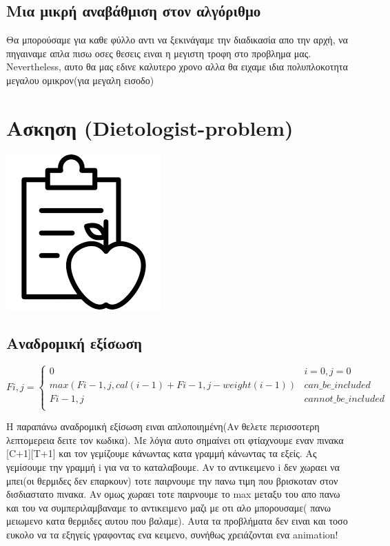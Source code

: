 \documentclass[12pt]{article}
\begin{document}
\subsection{Μια μικρή αναβάθμιση στον αλγόριθμο}
Θα μπορούσαμε για καθε φύλλο αντι να ξεκινάγαμε την διαδικασία απο την αρχή, να πηγαιναμε απλα πισω οσες θεσεις ειναι η μεγιστη τροφη στο προβλημα μας. Nevertheless, αυτο θα μας εδινε καλυτερο χρονο αλλα θα ειχαμε ιδια πολυπλοκοτητα μεγαλου ομικρον(για μεγαλη εισοδο)



\section{Ασκηση (Dietologist-problem)}
\begin{center}
	\includegraphics[scale=0.45]{diet.png}
\end{center}


\subsection{Αναδρομική εξίσωση}


\[ 
F{i,j}= \left\{
\begin{array}{ll}
0 & i=0,j=0 \\
max(F{i-1,j}, cal(i-1) + F{i-1, j - weight(i-1)})& can\_be\_included\\
F{i-1,j}& cannot\_be\_included \\
\end{array} 
\right. 
\]

Η παραπάνω αναδρομική εξίσωση ειναι απλοποιημένη(Αν θελετε περισσοτερη λεπτομερεια δειτε τον κωδικα). Με λόγια αυτο σημαίνει οτι φτίαχνουμε εναν πινακα [C+1][T+1] και τον γεμίζουμε κάνωντας κατα γραμμή κάνωντας τα εξείς. Ας γεμίσουμε την γραμμή i για να το καταλαβουμε. Αν το αντικειμενο i δεν χωραει να μπει(οι θερμιδες δεν επαρκουν) τοτε παιρνουμε την πανω τιμη που βρισκοταν στον δισδιαστατο πινακα. Αν ομως χωραει τοτε παιρνουμε το max μεταξυ του απο πανω και του να συμπεριλαμβαναμε το αντικειμενο μαζι με οτι αλο μπορουσαμε( πανω μειωμενο κατα θερμιδες αυτου που βαλαμε). Αυτα τα προβλήματα δεν ειναι και τοσο ευκολο να τα εξηγείς γραφοντας ενα κειμενο, συνήθως χρειάζονται ενα animation!
\end{document}
